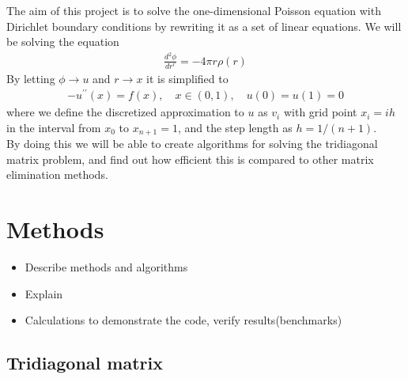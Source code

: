 \documentclass[12pt]{article}
\begin{document}
\noindent The aim of this project is to solve the one-dimensional Poisson equation with Dirichlet boundary conditions by rewriting it as a set of linear equations. We will be solving the equation
\begin{align*}
\frac{d^2\phi}{dr^r} = -4 \pi r \rho(r)
\end{align*}
\noindent By letting $\phi \rightarrow u$ and $r \rightarrow x$ it is simplified to
\begin{align*}
-u^{\prime \prime}(x) = f(x), \quad x \in (0,1), \quad  u(0) = u(1) = 0
\end{align*} 
where we define the discretized approximation to $u$ as $v_i$ with grid point $x_i = ih$ in the interval from $x_0$ to $x_{n+1} = 1$, and the step length as $h = 1/(n+1)$. \\

\noindent By doing this we will be able to create algorithms for solving the tridiagonal matrix problem, and find out how efficient this is compared to other matrix elimination methods. 


\section{Methods}

\begin{itemize}
\item Describe methods and algorithms
\item Explain
\item Calculations to demonstrate the code, verify results(benchmarks) 
\end{itemize}

\subsection{Tridiagonal matrix}
\end{document}
